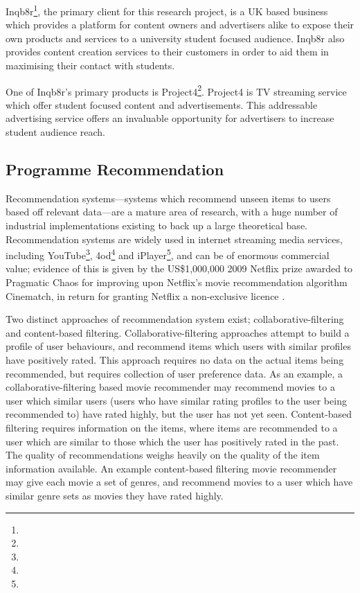 	Inqb8r\footnote{}, the primary client for this research project, is a UK based business which provides a platform for content owners and advertisers alike to expose their own products and services to a university student focused audience. Inqb8r also provides content creation services to their customers in order to aid them in maximising their contact with students.

	One of Inqb8r's primary products is Project4\footnote{}. Project4 is TV streaming service which offer student focused content and advertisements. This addressable advertising service offers an invaluable opportunity for advertisers to increase student audience reach.

	\subsection{Programme Recommendation}

	Recommendation systems---systems which recommend unseen items to users based off relevant data---are a mature area of research, with a huge number of industrial implementations existing to back up a large theoretical base. Recommendation systems are widely used in internet streaming media services, including YouTube\footnote{}, 4od\footnote{} and iPlayer\footnote{}, and can be of enormous commercial value; evidence of this is given by the US\$1,000,000 2009 Netflix prize awarded to Pragmatic Chaos for improving upon Netflix's movie recommendation algorithm Cinematch, in return for granting Netflix a non-exclusive licence \citep{pragmatic_chaos}.

	Two distinct approaches of recommendation system exist; collaborative-filtering and content-based filtering. Collaborative-filtering approaches attempt to build a profile of user behaviours, and recommend items which users with similar profiles have positively rated. This approach requires no data on the actual items being recommended, but requires collection of user preference data. As an example, a collaborative-filtering based movie recommender may recommend movies to a user which similar users (users who have similar rating profiles to the user being recommended to) have rated highly, but the user has not yet seen. Content-based filtering requires information on the items, where items are recommended to a user which are similar to those which the user has positively rated in the past. The quality of recommendations weighs heavily on the quality of the item information available. An example content-based filtering movie recommender may give each movie a set of genres, and recommend movies to a user which have similar genre sets as movies they have rated highly.

